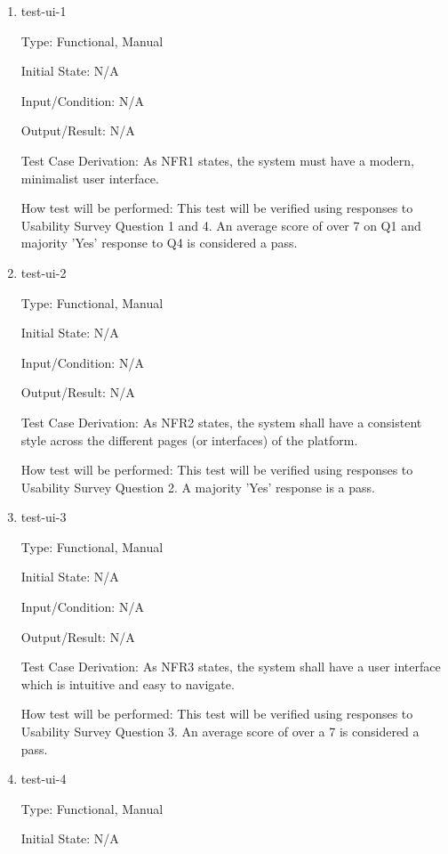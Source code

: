 \documentclass[12pt, titlepage]{article}
\begin{document}
\begin{enumerate}

\item{test-ui-1\\}

Type: Functional, Manual
					
Initial State: N/A
					
Input/Condition: N/A
					
Output/Result: N/A

Test Case Derivation: As NFR1 states, the system must have a modern, minimalist user interface.
					
How test will be performed: This test will be verified using responses to Usability Survey Question 1 and 4. An average score of over 7 on Q1 and majority 'Yes' response to Q4 is considered a pass.
					
\item{test-ui-2\\}

Type: Functional, Manual

Initial State: N/A

Input/Condition: N/A

Output/Result: N/A

Test Case Derivation: As NFR2 states, the system shall have a consistent style across the different pages (or interfaces) of the platform.

How test will be performed: This test will be verified using responses to Usability Survey Question 2. A majority 'Yes' response is a pass.

\item{test-ui-3\\}

Type: Functional, Manual

Initial State: N/A

Input/Condition: N/A

Output/Result: N/A

Test Case Derivation: As NFR3 states, the system shall have a user interface which is intuitive and easy to navigate.

How test will be performed: This test will be verified using responses to Usability Survey Question 3. An average score of over a 7 is considered a pass.

\item{test-ui-4\\}

Type: Functional, Manual

Initial State: N/A


\end{enumerate}
\end{document}

